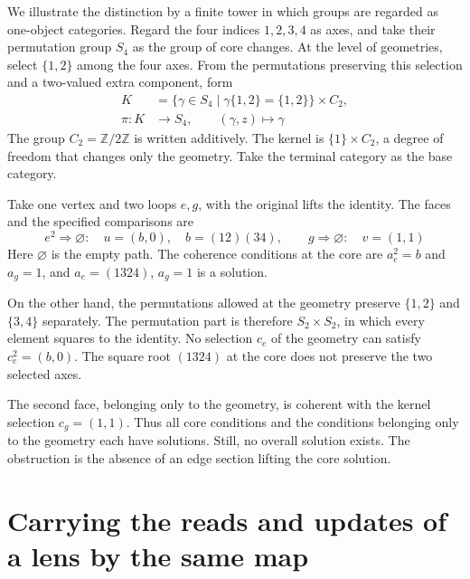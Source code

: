 \begin{example}\label{ex:4.35}

We illustrate the distinction by a finite tower in which groups are regarded
as one-object categories.
Regard the four indices $1,2,3,4$ as axes, and take their permutation group $S_4$
as the group of core changes. At the level of geometries, select $\{1,2\}$
among the four axes. From the permutations preserving this selection and a
two-valued extra component, form
\begin{equation*}
\begin{aligned}
K&=\{\gamma\in S_4\mid\gamma\{1,2\}=\{1,2\}\}\times C_2,\\
\pi:K&\longrightarrow S_4,\qquad(\gamma,z)\longmapsto\gamma
\end{aligned}
\tag{4.42}\label{eq:4.42}
\end{equation*}
The group $C_2=\mathbb{Z}/2\mathbb{Z}$ is written additively.
The kernel is $\{1\}\times C_2$, a degree of freedom that changes only the geometry.
Take the terminal category as the base category.

Take one vertex and two loops $e,g$, with the original lifts the identity.
The faces and the specified comparisons are
\begin{equation*}
e^2\Rightarrow\varnothing:\quad u=(b,0),\quad b=(12)(34),
\qquad
g\Rightarrow\varnothing:\quad v=(1,1)
\tag{4.43}\label{eq:4.43}
\end{equation*}
Here $\varnothing$ is the empty path.
The coherence conditions at the core are $a_e^2=b$ and $a_g=1$, and
$a_e=(1324)$, $a_g=1$ is a solution.

On the other hand, the permutations allowed at the geometry preserve $\{1,2\}$ and $\{3,4\}$
separately.
The permutation part is therefore $S_2\times S_2$, in which every element squares to the
identity.
No selection $c_e$ of the geometry can satisfy $c_e^2=(b,0)$.
The square root $(1324)$ at the core does not preserve the two selected axes.

The second face, belonging only to the geometry, is coherent with the kernel selection $c_g=(1,1)$.
Thus all core conditions and the conditions belonging only to the geometry each
have solutions.
Still, no overall solution exists.
The obstruction is the absence of an edge section lifting the core solution.

\end{example}

\section{Carrying the reads and updates of a lens by the same map}\label{sec:4.10}

